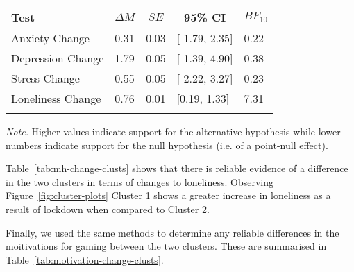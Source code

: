 \documentclass[
  english,
  jou,floatsintext]{apa6}
\begin{document}
\begin{table*}[tbp]

\begin{center}
\begin{threeparttable}

\caption{\label{tab:mh-change-clusts}Bayes factors for the change in depression, anxiety, stress, and loneliness evaluating evidence in support of the alternative hypothesis (i.e. of a non-null effect)}

\begin{tabular}{lllll}
\toprule
Test & \multicolumn{1}{c}{$\Delta{M}$} & \multicolumn{1}{c}{$SE$} & \multicolumn{1}{c}{95\% CI} & \multicolumn{1}{c}{$BF_{10}$}\\
\midrule
Anxiety Change & 0.31 & 0.03 & [-1.79, 2.35] & 0.22\\
Depression Change & 1.79 & 0.05 & [-1.39, 4.90] & 0.38\\
Stress Change & 0.55 & 0.05 & [-2.22, 3.27] & 0.23\\
Loneliness Change & 0.76 & 0.01 & [0.19, 1.33] & 7.31\\
\bottomrule
\addlinespace
\end{tabular}

\begin{tablenotes}[para]
\normalsize{\textit{Note.} Higher values indicate support for the alternative hypothesis while lower numbers indicate support for the null hypothesis (i.e. of a point-null effect).}
\end{tablenotes}

\end{threeparttable}
\end{center}

\end{table*}

Table~\ref{tab:mh-change-clusts} shows that there is reliable evidence of a difference in the two clusters in terms of changes to loneliness. Observing Figure~\ref{fig:cluster-plots} Cluster 1 shows a greater increase in loneliness as a result of lockdown when compared to Cluster 2.

Finally, we used the same methods to determine any reliable differences in the moitivations for gaming between the two clusters. These are summarised in Table~\ref{tab:motivation-change-clusts}.
\end{document}
